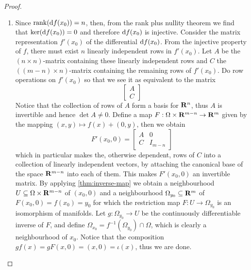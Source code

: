 \begin{proof}
\begin{enumerate}\setlength\itemsep{0em}
  \item Since \(\operatorname{rank}(\mathrm{d} f(x_0)) = n\), then, from the rank plus nullity
    theorem we find that \(\ker (\mathrm{d} f(x_0)) = 0\) and therefore \(\mathrm{d}
    f(x_{0})\) is injective. Consider the matrix representation \(f'(x_0)\)
    of the differential \(\mathrm{d} f(x_0)\). From the injective property of
    \(f\), there must exist \(n\) linearly independent rows in
    \(f'(x_0)\). Let \(A\) be the \((n \times n)\)-matrix containing these linearly
    independent rows and \(C\) the \(((m - n) \times n)\)-matrix containing the
    remaining rows of \(f'(x_0)\). Do row operations on \(f'(x_0)\) so that we
    see it as equivalent to the matrix
    \[
      \begin{bmatrix}
        A \\ C
      \end{bmatrix}
    \]
    Notice that the collection of rows of \(A\) form a basis for \(\mathbf{R}^n\),
    thus \(A\) is invertible and hence \(\det A \neq 0\). Define a map \(F: \Omega \times
    \mathbf{R}^{m-n} \to \mathbf{R}^m\) given by the mapping \((x, y) \mapsto f(x) + (0, y)\), then we
    obtain
    \[
      F'(x_0, 0) =
      \begin{bmatrix}
        A &0 \\ C &I_{m - n}
      \end{bmatrix}
    \]
    which in particular makes the, otherwise dependent, rows of \(C\) into a
    collection of linearly independent vectors, by attaching the canonical
    base of the space \(\mathbf{R}^{m-n}\) into each of them. This makes \(F'(x_0,
    0)\) an invertible matrix. By applying \cref{thm:inverse-map} we obtain a
    neighbourhood \(U \subseteq \Omega \times \mathbf{R}^{m-n}\) of \((x_0, 0)\) and a neighbourhood
    \(\Omega_{y_0} \subseteq \mathbf{R}^m\) of \(F(x_0, 0) = f(x_{0}) = y_0\) for which the
    restriction map \(F: U \to \Omega_{y_0}\) is an isomorphism of manifolds. Let \(g:
    \Omega_{y_0} \to U\) be the continuously differentiable inverse of \(F\), and
    define \(\Omega_{x_0} = f^{-1}(\Omega_{y_0}) \cap \Omega\), which is clearly a neighbourhood
    of \(x_0\). Notice that the composition \(g f(x) = g F (x, 0) = (x, 0) =
    \iota(x)\), thus we are done.


\end{enumerate}
\end{proof}
